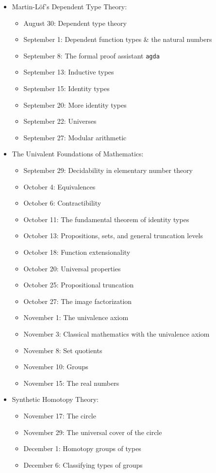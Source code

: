\documentclass{amsart}
\theoremstyle{definition}
\theoremstyle{remark}
\numberwithin{equation}{section}
\begin{document}
\begin{itemize}
\item {Martin-L\"of's Dependent Type Theory:}
\begin{itemize}
\item {August 30: Dependent type theory}
\item {September 1: Dependent function types \& the natural numbers}
\item {September 8: The formal proof assistant \texttt{agda}}
\item {September 13: Inductive types}
\item {September 15: Identity types}
\item {September 20: More identity types}
\item {September 22: Universes}
\item {September 27: Modular arithmetic}
\end{itemize}
\item {The Univalent Foundations of Mathematics:}
\begin{itemize}
\item {September 29: Decidability in elementary number theory}
\item {October 4: Equivalences}
\item {October 6: Contractibility}
\item {October 11: The fundamental theorem of identity types}
\item {October 13: Propositions, sets, and general truncation levels}
\item {October 18: Function extensionality}
\item {October 20: Universal properties}
\item {October 25: Propositional truncation}
\item {October 27: The image factorization}
\item {November 1: The univalence axiom}
\item {November 3: Classical mathematics with the univalence axiom}
\item {November 8: Set quotients}
\item {November 10: Groups}
\item {November 15: The real numbers}
\end{itemize}
\item {Synthetic Homotopy Theory:}
\begin{itemize}
\item {November 17: The circle}
\item {November 29: The universal cover of the circle}
\item {December 1: Homotopy groups of types}
\item {December 6: Classifying types of groups}
\end{itemize}
\end{itemize}

 
\end{document}
